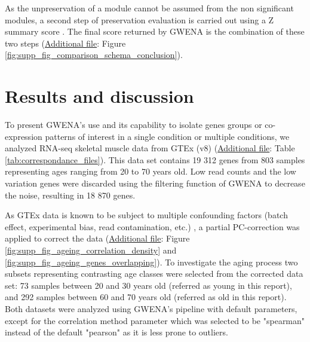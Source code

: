 As the unpreservation of a module cannot be assumed from the non significant modules, a second step of preservation evaluation is carried out using a Z summary score . The final score returned by GWENA is the combination of these two steps (\hyperref[annexe:supp_file_GWENA]{Additional file}: Figure \ref{fig:supp_fig_comparison_schema_conclusion}).




\section{Results and discussion}

To present GWENA's use and its capability to isolate genes groups or co-expression patterns of interest in a single condition or multiple conditions, we analyzed RNA-seq skeletal muscle data from GTEx (v8) (\hyperref[annexe:supp_file_GWENA]{Additional file}: Table \ref{tab:correspondance_files}). This data set contains 19 312 genes from 803 samples representing ages ranging from 20 to 70 years old. Low read counts and the low variation genes were discarded using the filtering function of GWENA to decrease the noise, resulting in 18 870 genes.

As GTEx data is known to be subject to multiple confounding factors (batch effect, experimental bias, read contamination, etc.) , a partial PC-correction was applied to correct the data (\hyperref[annexe:supp_file_GWENA]{Additional file}: Figure \ref{fig:supp_fig_ageing_correlation_density} and \ref{fig:supp_fig_ageing_genes_overlapping}). To investigate the aging process two subsets representing contrasting age classes were selected from the corrected data set: 73 samples between 20 and 30 years old (referred as young in this report), and 292 samples between 60 and 70 years old (referred as old in this report). Both datasets were analyzed using GWENA's pipeline with default parameters, except for the correlation method parameter which was selected to be "spearman" instead of the default "pearson" as it is less prone to outliers. 

